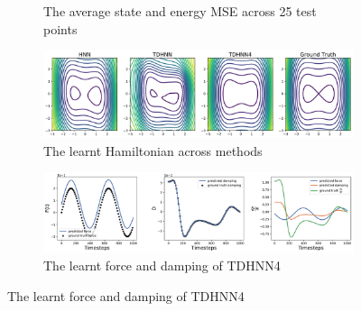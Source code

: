 \documentclass[twoside]{article}
\begin{document}
\begin{figure}[!htb]
\begin{subfigure}[b]{0.48\textwidth}
\caption{The average state and energy MSE across 25 test points}
\end{subfigure}
\begin{subfigure}[b]{0.48\textwidth}
\includegraphics[width=\textwidth]{figures/figures/duffing/1/duffing_hamiltonian_0.pdf}
\caption{The learnt Hamiltonian across methods}
\end{subfigure}
\begin{subfigure}[b]{0.48\textwidth}
\includegraphics[width=\textwidth]{figures/figures/duffing/1/duffing_dpdt_0.pdf}
\caption{The learnt force and damping of TDHNN4}
\end{subfigure}
\label{duffing_1_full}
\end{figure}
\end{document}
